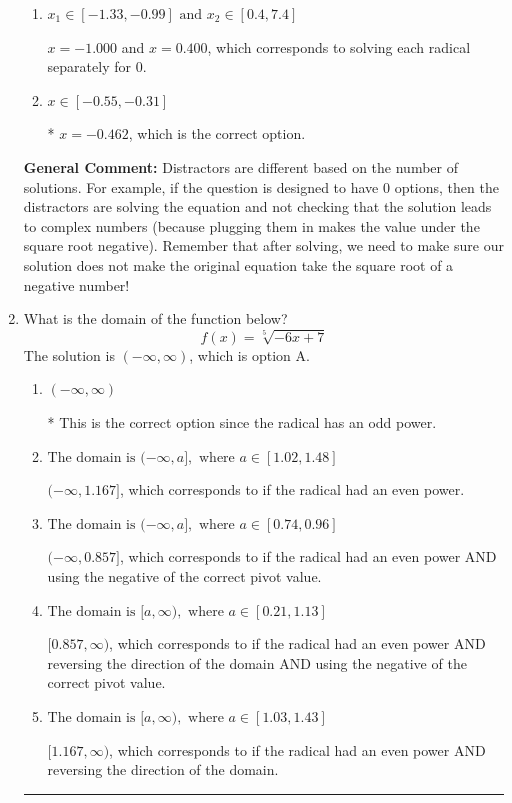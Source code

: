 \documentclass{extbook}[14pt]
\newcommand{\litem}[1]{\item #1

\rule{\textwidth}{0.4pt}}
\begin{document}
\begin{enumerate}
{\begin{enumerate}[label=\Alph*.]
This corresponds to believing the solution $x = -0.462$ leads to a complex value in the original equation.
\item \( x_1 \in [-1.33, -0.99] \text{ and } x_2 \in [0.4,7.4] \)

$x = -1.000$ and $x = 0.400$, which corresponds to solving each radical separately for 0.
\item \( x \in [-0.55,-0.31] \)

* $x = -0.462$, which is the correct option.
\end{enumerate}

\textbf{General Comment:} Distractors are different based on the number of solutions. For example, if the question is designed to have 0 options, then the distractors are solving the equation and not checking that the solution leads to complex numbers (because plugging them in makes the value under the square root negative). Remember that after solving, we need to make sure our solution does not make the original equation take the square root of a negative number!
}
\litem{
What is the domain of the function below?
\[ f(x) = \sqrt[5]{-6 x + 7} \]The solution is \( (-\infty, \infty) \), which is option A.\begin{enumerate}[label=\Alph*.]
\item \( (-\infty, \infty) \)

* This is the correct option since the radical has an odd power.
\item \( \text{The domain is } (-\infty, a], \text{   where } a \in [1.02, 1.48] \)

$(-\infty, 1.167]$, which corresponds to if the radical had an even power.
\item \( \text{The domain is } (-\infty, a], \text{   where } a \in [0.74, 0.96] \)

$(-\infty, 0.857]$, which corresponds to if the radical had an even power AND using the negative of the correct pivot value.
\item \( \text{The domain is } [a, \infty), \text{   where } a \in [0.21, 1.13] \)

$[0.857, \infty)$, which corresponds to if the radical had an even power AND reversing the direction of the domain AND using the negative of the correct pivot value.
\item \( \text{The domain is } [a, \infty), \text{   where } a \in [1.03, 1.43] \)

$[1.167, \infty)$, which corresponds to if the radical had an even power AND reversing the direction of the domain.
\end{enumerate}

}
\end{enumerate}
\end{document}
